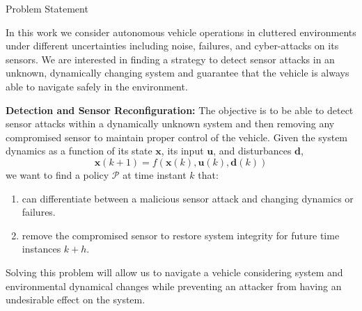 \begin{section}{Problem Statement}
	
\label{sec:problem}

In this work we consider autonomous vehicle operations in cluttered environments under different uncertainties including noise, failures, and cyber-attacks on its sensors. 
We are interested in finding a strategy to detect sensor attacks in an unknown, dynamically changing system and guarantee that the vehicle is always able to navigate safely in the environment.%










\begin{problem} 
\label{problem1} {\textbf{Detection and Sensor Reconfiguration:}} 
The objective is to be able to detect sensor attacks within a dynamically unknown system and then removing any compromised sensor to maintain proper control of the vehicle. Given the system dynamics as a function of its state $ \bm{x} $, its input $ \bm{u}$, and disturbances $ \bm{d} $,
	\begin{equation}
		\bm{x}(k+1) = f(\bm{x}(k), \bm{u}(k), \bm{d}(k))
	\end{equation}
we want to find a policy $\mathcal{P}$ at time instant $k$ that:
\begin{enumerate}
	\item can differentiate between a malicious sensor attack and changing dynamics or failures. 
	\item remove the compromised sensor to restore system integrity for future time instances $k+h$. 
\end{enumerate}
Solving this problem will allow us to navigate a vehicle considering system and environmental dynamical changes while preventing an attacker from having an undesirable effect on the system. 
\end{problem}
	

\end{section}
